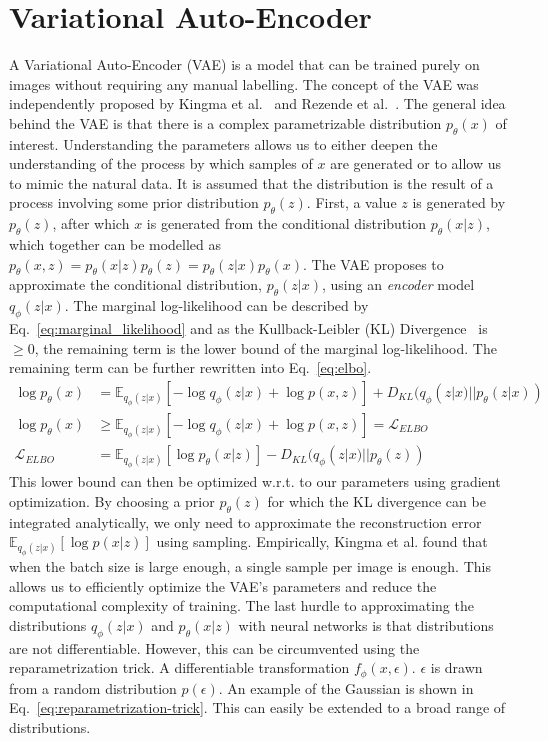 \section{Variational Auto-Encoder}
A Variational Auto-Encoder (VAE) is a model that can be trained purely on images without requiring any manual labelling. The concept of the VAE was independently proposed by Kingma et al.~\cite{kingma2014autoencodingvariationalbayes} and Rezende et al.~\cite{rezende2014stochastic}. The general idea behind the VAE is that there is a complex parametrizable distribution $p_\theta(x)$ of interest. Understanding the parameters allows us to either deepen the understanding of the process by which samples of $x$ are generated or to allow us to mimic the natural data. It is assumed that the distribution is the result of a process involving some prior distribution $p_\theta(z)$. First, a value $z$ is generated by $p_\theta(z)$, after which $x$ is generated from the conditional distribution $p_\theta(x | z)$, which together can be modelled as $p_\theta(x, z) = p_\theta(x|z)p_\theta(z) = p_\theta(z|x)p_\theta(x)$. The VAE proposes to approximate the conditional distribution, $p_\theta(z|x)$, using an \emph{encoder} model $q_\phi(z|x)$. The marginal log-likelihood can be described by Eq.~\ref{eq:marginal_likelihood} and as the Kullback-Leibler (KL) Divergence~\cite{kullback1951information} is $\geq 0$, the remaining term is the lower bound of the marginal log-likelihood. The remaining term can be further rewritten into Eq.~\ref{eq:elbo}.
\begin{subequations}
    \begin{align}
        \log p_\theta(x)   & = \mathbb{E}_{q_{\phi}(z|x)}[-\log q_\phi(z|x) + \log p(x,z)] + D_{KL}(q_{\phi}(z|x) || p_\theta(z|x))\label{eq:marginal_likelihood} \\
        \log p_\theta(x)   & \geq \mathbb{E}_{q_{\phi}(z|x)}[-\log q_\phi(z|x) + \log p(x,z)] = \mathcal{L}_{ELBO}                                                \\
        \mathcal{L}_{ELBO} & = \mathbb{E}_{q_{\phi}(z|x)}[\log p_\theta(x|z)] - D_{KL}(q_{\phi}(z|x) || p_\theta(z))\label{eq:elbo}
    \end{align}
\end{subequations}
This lower bound can then be optimized w.r.t. to our parameters using gradient optimization. By choosing a prior $p_\theta(z)$ for which the KL divergence can be integrated analytically, we only need to approximate the reconstruction error $\mathbb{E}_{q_{\phi}(z|x)}[\log p(x|z)]$ using sampling. Empirically, Kingma et al. found that when the batch size is large enough, a single sample per image is enough. This allows us to efficiently optimize the VAE's parameters and reduce the computational complexity of training. The last hurdle to approximating the distributions $q_{\phi}(z | x)$ and $p_{\theta}(x | z)$ with neural networks is that distributions are not differentiable. However, this can be circumvented using the reparametrization trick. A differentiable transformation $f_\phi(x, \epsilon)$. $\epsilon$ is drawn from a random distribution $p(\epsilon)$. An example of the Gaussian is shown in Eq.~\ref{eq:reparametrization-trick}. This can easily be extended to a broad range of distributions.
